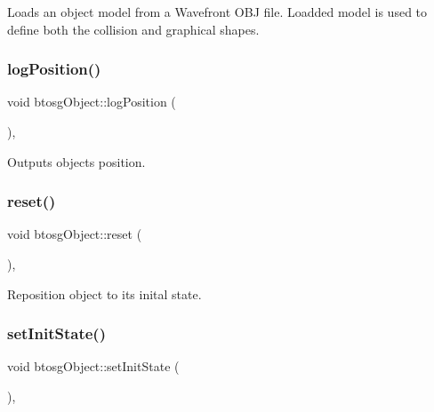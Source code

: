 Loads an object model from a Wavefront O\+BJ file. Loadded model is used to define both the collision and graphical shapes. \mbox{\label{classbtosgObject_acfd70fa6477c80fd7f29ad7ab9f4f067}} 
\subsubsection{\texorpdfstring{logPosition()}{logPosition()}}
{\footnotesize\ttfamily void btosg\+Object\+::log\+Position (\begin{DoxyParamCaption}{ }\end{DoxyParamCaption})\hspace{0.3cm}{\ttfamily [inline]}, {\ttfamily [inherited]}}

Outputs object\textquotesingle{}s position. \mbox{\label{classbtosgObject_a93983f9180dd0672f8779cf2baa78580}} 
\subsubsection{\texorpdfstring{reset()}{reset()}}
{\footnotesize\ttfamily void btosg\+Object\+::reset (\begin{DoxyParamCaption}{ }\end{DoxyParamCaption})\hspace{0.3cm}{\ttfamily [inline]}, {\ttfamily [inherited]}}

Reposition object to its inital state. \mbox{\label{classbtosgObject_ad1508a0ce28cfac83e5f0ff6245f91b5}} 
\subsubsection{\texorpdfstring{setInitState()}{setInitState()}\hspace{0.1cm}{\footnotesize\ttfamily [1/2]}}
{\footnotesize\ttfamily void btosg\+Object\+::set\+Init\+State (\begin{DoxyParamCaption}{ }\end{DoxyParamCaption})\hspace{0.3cm}{\ttfamily [inline]}, {\ttfamily [inherited]}}


